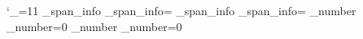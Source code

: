%
%
\catcode`_=11 %
%
% 
\declaretoks\column_span_info
\column_span_info={}%
\declaretoks\row_span_info
\row_span_info={}%
%
\let\process=\relax
%
\declarecount\column_number
\column_number=0
%
%
\def\column#1{\relax
   \advance\column_number \by 1
   \last_column=\column_number
   \get_column_number_data
   \add_column_number_data {#1}%
   \ignorespaces
   }%
%
\declarecount\row_number
\row_number=0
%
%
\def\row#1{\relax
   \advance\row_number \by 1
   \message{Scanning row \the\row_number.}%
   \last_row=\row_number
   \everyrow
   \get_row_number_data
   \add_row_number_data {#1}%
   \column_number=0
   \ignorespaces
   }%
%
%
\def\blank{\relax
   \advance\column_number \by 1
   \if\column_number>\last_column
      \advance\column_number \by -1
      \column{}%
   \fi
   \everycolumn
   \get_column_number_data
   \ifnum\merge_rows>1
      \add_column_number_data {\merge_rows=0\relax}%
   \fi
   \merge_columns=0
   }%
%
%
